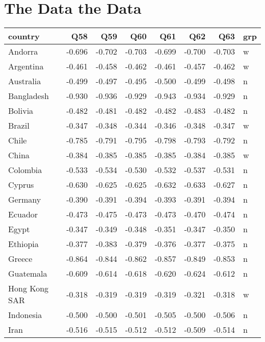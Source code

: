 \documentclass{amsart}
\begin{document}
\section{The Data the Data}

\begin{longtable}{lrrrrrrl}
  \hline
country & Q58 & Q59 & Q60 & Q61 & Q62 & Q63 & grp \\ 
  \hline
Andorra & -0.696 & -0.702 & -0.703 & -0.699 & -0.700 & -0.703 & w \\ 
  Argentina & -0.461 & -0.458 & -0.462 & -0.461 & -0.457 & -0.462 & w \\ 
  Australia & -0.499 & -0.497 & -0.495 & -0.500 & -0.499 & -0.498 & n \\ 
  Bangladesh & -0.930 & -0.936 & -0.929 & -0.943 & -0.934 & -0.929 & n \\ 
  Bolivia & -0.482 & -0.481 & -0.482 & -0.482 & -0.483 & -0.482 & n \\ 
  Brazil & -0.347 & -0.348 & -0.344 & -0.346 & -0.348 & -0.347 & w \\ 
  Chile & -0.785 & -0.791 & -0.795 & -0.798 & -0.793 & -0.792 & n \\ 
  China & -0.384 & -0.385 & -0.385 & -0.385 & -0.384 & -0.385 & w \\ 
  Colombia & -0.533 & -0.534 & -0.530 & -0.532 & -0.537 & -0.531 & n \\ 
  Cyprus & -0.630 & -0.625 & -0.625 & -0.632 & -0.633 & -0.627 & n \\ 
  Germany & -0.390 & -0.391 & -0.394 & -0.393 & -0.391 & -0.394 & n \\ 
  Ecuador & -0.473 & -0.475 & -0.473 & -0.473 & -0.470 & -0.474 & n \\ 
  Egypt & -0.347 & -0.349 & -0.348 & -0.351 & -0.347 & -0.350 & n \\ 
  Ethiopia & -0.377 & -0.383 & -0.379 & -0.376 & -0.377 & -0.375 & n \\ 
  Greece & -0.864 & -0.844 & -0.862 & -0.857 & -0.849 & -0.853 & n \\ 
  Guatemala & -0.609 & -0.614 & -0.618 & -0.620 & -0.624 & -0.612 & n \\ 
  Hong Kong SAR & -0.318 & -0.319 & -0.319 & -0.319 & -0.321 & -0.318 & w \\ 
  Indonesia & -0.500 & -0.500 & -0.501 & -0.505 & -0.500 & -0.506 & n \\ 
  Iran & -0.516 & -0.515 & -0.512 & -0.512 & -0.509 & -0.514 & n \\ 

\end{longtable}
\end{document}
